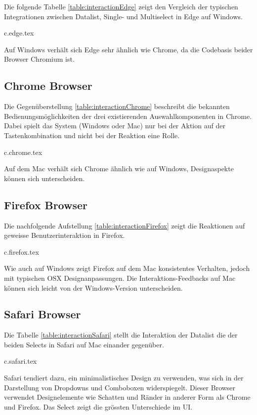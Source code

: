 Die folgende Tabelle \ref{table:interactionEdge} zeigt den Vergleich der typischen Integrationen zwischen Datalist, Single- und Multiselect in Edge auf Windows.

{c.edge.tex}

Auf Windows verhält sich Edge sehr ähnlich wie Chrome, da die Codebasis beider Browser Chromium ist.


\clearpage
\subsection{Chrome Browser}
\label{sec:chromeBrowser}

Die Gegenüberstellung \ref{table:interactionChrome} beschreibt die bekannten Bedienungsmöglichkeiten der drei existierenden Auswahlkomponenten in Chrome.
Dabei spielt das System (Windows oder Mac) nur bei der Aktion auf der Tastenkombination und nicht bei der Reaktion eine Rolle.

{c.chrome.tex}

Auf dem Mac verhält sich Chrome ähnlich wie auf Windows, Designaspekte können sich unterscheiden. 


\clearpage
\subsection{Firefox Browser}
\label{sec:firefoxBrowser}

Die nachfolgende Aufstellung \ref{table:interactionFirefox} zeigt die Reaktionen auf geweisse Benutzerinteraktion in Firefox.

{c.firefox.tex}

Wie auch auf Windows zeigt Firefox auf dem Mac konsistentes Verhalten, jedoch mit typischen OSX Designanpassungen. 
Die Interaktions-Feedbacks auf Mac können sich leicht von der Windows-Version unterscheiden.


\clearpage
\subsection{Safari Browser}
\label{sec:safariBrowser}

Die Tabelle \ref{table:interactionSafari} stellt die Interaktion der Datalist die der beiden Selects in Safari auf Mac einander gegenüber.

{c.safari.tex}

Safari tendiert dazu, ein minimalistisches Design zu verwenden, was sich in der Darstellung von Dropdowns und Comboboxen widerspiegelt.
Dieser Browser verwendet Designelemente wie Schatten und Ränder in anderer Form als Chrome und Firefox.
Das Select zeigt die grössten Unterschiede im UI.


